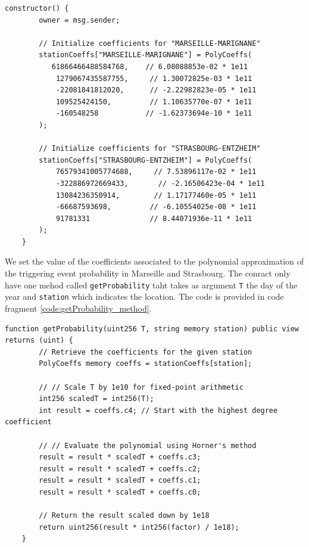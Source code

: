 \documentclass[10pt]{article}
\begin{document}
\begin{codefragment}[!ht]
\begin{lstlisting}[language=Solidity]
    constructor() {
        owner = msg.sender;

        // Initialize coefficients for "MARSEILLE-MARIGNANE"
        stationCoeffs["MARSEILLE-MARIGNANE"] = PolyCoeffs(
           61866466488584768,    // 6.08088853e-02 * 1e11
            1279067435587755,     // 1.30072825e-03 * 1e11
            -22081841812020,      // -2.22982823e-05 * 1e11
            109525424150,         // 1.10635770e-07 * 1e11
            -160548258           // -1.62373694e-10 * 1e11
        );

        // Initialize coefficients for "STRASBOURG-ENTZHEIM"
        stationCoeffs["STRASBOURG-ENTZHEIM"] = PolyCoeffs(
            76579341005774688,     // 7.53896117e-02 * 1e11
            -322886972669433,       // -2.16506423e-04 * 1e11
            13084236350914,        // 1.17177460e-05 * 1e11
            -66687593698,         // -6.10554025e-08 * 1e11
            91781331              // 8.44071936e-11 * 1e11
        );
    }

\end{lstlisting}
    \caption{Constructor method of \texttt{PricingLogic}.}
    \label{code:constructor_PricingLogic}
\end{codefragment}

We set the value of the coefficients associated to the polynomial approximation of the triggering event probability in Marseille and Strasbourg.  The conract only have one mehod called \texttt{getProbability} taht takes as argument \texttt{T} the day of the year and \texttt{station} which indicates the location. The code is provided in code fragment \ref{code:getProbability_method}.

\begin{codefragment}[!ht]
\begin{lstlisting}[language=Solidity]
    function getProbability(uint256 T, string memory station) public view returns (uint) {
        // Retrieve the coefficients for the given station
        PolyCoeffs memory coeffs = stationCoeffs[station];

        // // Scale T by 1e10 for fixed-point arithmetic
        int256 scaledT = int256(T);
        int result = coeffs.c4; // Start with the highest degree coefficient

        // // Evaluate the polynomial using Horner's method
        result = result * scaledT + coeffs.c3;
        result = result * scaledT + coeffs.c2;
        result = result * scaledT + coeffs.c1;
        result = result * scaledT + coeffs.c0;

        // Return the result scaled down by 1e18
        return uint256(result * int256(factor) / 1e18);
    }

\end{lstlisting}
    \caption{\texttt{getProbability} method of the \texttt{PricingLogic} contract.}
    \label{code:getProbability_method}
\end{codefragment}
\end{document}
